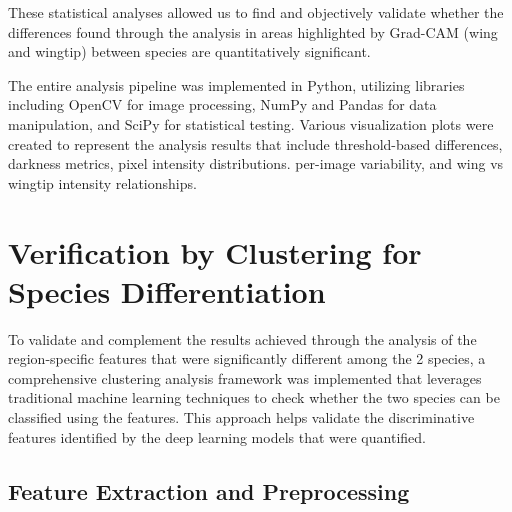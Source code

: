 \documentclass[a4paper,12pt]{report}
\begin{document}



These statistical analyses allowed us to find and objectively validate whether the differences found through the analysis in areas highlighted by Grad-CAM (wing and wingtip) between species are quantitatively significant.

The entire analysis pipeline was implemented in Python, utilizing libraries including OpenCV for image processing, NumPy and Pandas for data manipulation, and SciPy for statistical testing. Various visualization plots were created to represent the analysis results that include threshold-based differences, darkness metrics, pixel intensity distributions. per-image variability, and wing vs wingtip intensity relationships.

\section{Verification by Clustering for Species Differentiation}

To validate and complement the results achieved through the analysis of the region-specific features that were significantly different among the 2 species, a comprehensive clustering analysis framework was implemented that leverages traditional machine learning techniques to check whether the two species can be classified using the features. This approach helps validate the discriminative features identified by the deep learning models that were quantified.

\subsection{Feature Extraction and Preprocessing}
\end{document}
